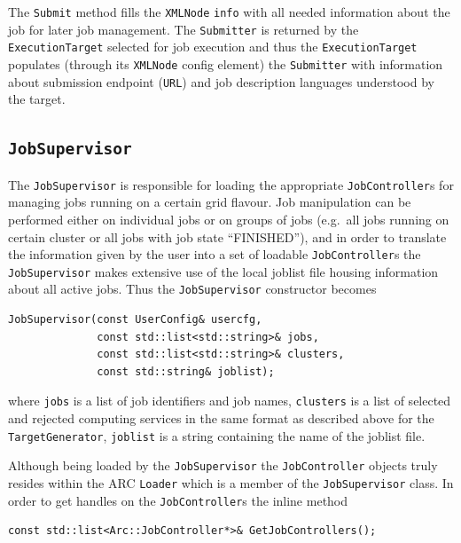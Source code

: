 \documentclass{book}
\newcommand{\ExecutionTarget}{\texttt{ExecutionTarget}}
\newcommand{\JobController}{\texttt{JobController}}
\newcommand{\JobSupervisor}{\texttt{JobSupervisor}}
\newcommand{\Loader}{\texttt{Loader}}
\newcommand{\TargetGenerator}{\texttt{TargetGenerator}}
\newcommand{\Submitter}{\texttt{Submitter}}
\newcommand{\URL}{\texttt{URL}}
\newcommand{\XMLNode}{\texttt{XMLNode}}
\begin{document}
The \texttt{Submit} method fills the {\XMLNode} \texttt{info} with all
needed information about the job for later job management. The
{\Submitter} is returned by the {\ExecutionTarget} selected for job
execution and thus the {\ExecutionTarget} populates (through its
{\XMLNode} config element) the {\Submitter} with information about
submission endpoint ({\URL}) and job description languages understood
by the target.

\subsection{{\JobSupervisor}}

The {\JobSupervisor} is responsible for loading the appropriate
{\JobController}s for managing jobs running on a certain grid
flavour. Job manipulation can be performed either on individual jobs
or on groups of jobs (e.g.\ all jobs running on certain cluster or all
jobs with job state ``FINISHED''), and in order to translate the
information given by the user into a set of loadable {\JobController}s
the {\JobSupervisor} makes extensive use of the local joblist file
housing information about all active jobs. Thus the {\JobSupervisor}
constructor becomes

\begin{shaded}
\begin{verbatim}
JobSupervisor(const UserConfig& usercfg,
              const std::list<std::string>& jobs,
              const std::list<std::string>& clusters,
              const std::string& joblist);
\end{verbatim}
\end{shaded}

where \texttt{jobs} is a list of job identifiers and job names,
\texttt{clusters} is a list of selected and rejected computing
services in the same format as described above for the
{\TargetGenerator}, \texttt{joblist} is a string containing the name
of the joblist file.

Although being loaded by the {\JobSupervisor} the {\JobController}
objects truly resides within the ARC {\Loader} which is a member of
the {\JobSupervisor} class. In order to get handles on the
{\JobController}s the inline method

\begin{shaded}
\begin{verbatim}
const std::list<Arc::JobController*>& GetJobControllers();
\end{verbatim}
\end{shaded}
\end{document}
